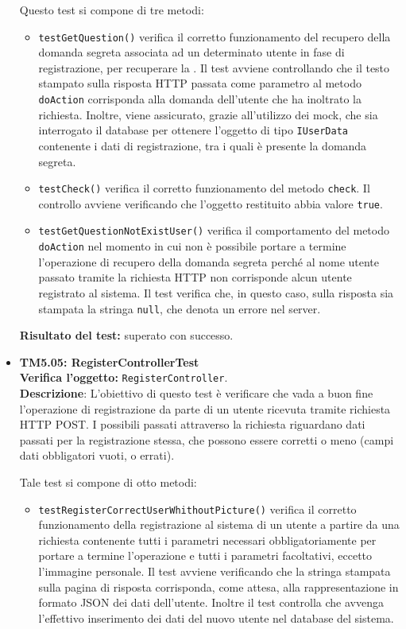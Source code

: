\begin{itemize}
Questo test si compone di tre metodi:
\begin{itemize}

\item \texttt{testGetQuestion()} verifica il corretto funzionamento del recupero della domanda segreta associata ad un determinato utente in fase di registrazione, per recuperare la .
Il test avviene controllando che il testo stampato sulla risposta HTTP passata come parametro al metodo \texttt{doAction} corrisponda alla domanda dell'utente che ha inoltrato la richiesta. Inoltre, viene assicurato, grazie all'utilizzo dei mock, che sia interrogato il database per ottenere l'oggetto di tipo \texttt{IUserData} contenente i dati di registrazione, tra i quali è presente la domanda segreta. 

\item \texttt{testCheck()} verifica il corretto funzionamento del metodo \texttt{check}. Il controllo avviene verificando che l'oggetto restituito abbia valore \texttt{true}.

\item \texttt{testGetQuestionNotExistUser()} verifica il comportamento del metodo \texttt{doAction} nel momento in cui non è possibile portare a termine l'operazione di recupero della domanda segreta perché al nome utente passato tramite la richiesta HTTP non corrisponde alcun utente registrato al sistema. Il test verifica che, in questo caso, sulla risposta sia stampata la stringa \texttt{null}, che denota un errore nel server.
 
\end{itemize}

\textbf{Risultato del test:} superato con successo.

\item[\passed] \textbf{TM5.05: RegisterControllerTest}\\
\textbf{Verifica l'oggetto:} \texttt{RegisterController}.\\
\textbf{Descrizione}: L'obiettivo di questo test è verificare che vada a buon fine l'operazione di registrazione da parte di un utente ricevuta tramite richiesta HTTP POST\@. I possibili  passati attraverso la richiesta riguardano dati passati per la registrazione stessa, che possono essere corretti o meno (campi dati obbligatori vuoti, o errati).

Tale test si compone di otto metodi:
\begin{itemize}
\item \texttt{testRegisterCorrectUserWhithoutPicture()} verifica il corretto funzionamento della registrazione al sistema di un utente a partire da una richiesta contenente tutti i parametri necessari obbligatoriamente per portare a termine l'operazione e tutti i parametri facoltativi, eccetto l'immagine personale. Il test avviene verificando che la stringa stampata sulla pagina di risposta corrisponda, come attesa, alla rappresentazione in formato JSON dei dati dell'utente. Inoltre il test controlla che avvenga l'effettivo inserimento dei dati del nuovo utente nel database del sistema.


\end{itemize}
\end{itemize}
